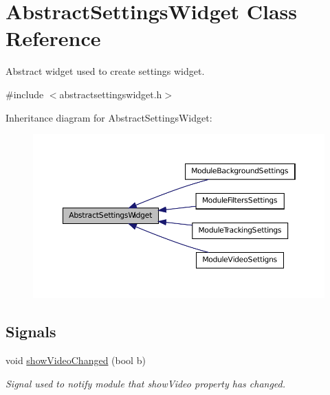 \hypertarget{class_abstract_settings_widget}{
\section{AbstractSettingsWidget Class Reference}
\label{db/dcb/class_abstract_settings_widget}
}


Abstract widget used to create settings widget.  




{\ttfamily \#include $<$abstractsettingswidget.h$>$}



Inheritance diagram for AbstractSettingsWidget:\nopagebreak
\begin{figure}[H]
\begin{center}
\leavevmode
\includegraphics[width=394pt]{db/de4/class_abstract_settings_widget__inherit__graph}
\end{center}
\end{figure}
\subsection*{Signals}
\begin{DoxyCompactItemize}
\item 
void \hyperlink{class_abstract_settings_widget_a949114dc2b02cc15bfd72069f5723bf9}{showVideoChanged} (bool b)
\begin{DoxyCompactList}\small\item\em Signal used to notify module that showVideo property has changed. \item\end{DoxyCompactList}\end{DoxyCompactItemize}
